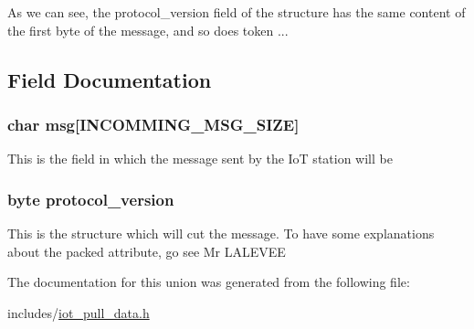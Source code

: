 As we can see, the protocol\-\_\-version field of the structure has the same content of the first byte of the message, and so does token ... 

\subsection{Field Documentation}
\hypertarget{unioniot__pull__data_a019f7d47cfe35a4e91ae5068647c1014}{
\subsubsection[{msg}]{\setlength{\rightskip}{0pt plus 5cm}char msg\mbox{[}{\bf I\-N\-C\-O\-M\-M\-I\-N\-G\-\_\-\-M\-S\-G\-\_\-\-S\-I\-Z\-E}\mbox{]}}}\label{unioniot__pull__data_a019f7d47cfe35a4e91ae5068647c1014}
This is the field in which the message sent by the Io\-T station will be \hypertarget{unioniot__pull__data_a4723ed0bc6ed806bf66757d25e40641a}{
\subsubsection[{protocol\-\_\-version}]{\setlength{\rightskip}{0pt plus 5cm}byte protocol\-\_\-version}}\label{unioniot__pull__data_a4723ed0bc6ed806bf66757d25e40641a}
This is the structure which will cut the message. To have some explanations about the packed attribute, go see Mr L\-A\-L\-E\-V\-E\-E 

The documentation for this union was generated from the following file\-:\begin{DoxyCompactItemize}
\item 
includes/\hyperlink{iot__pull__data_8h}{iot\-\_\-pull\-\_\-data.\-h}\end{DoxyCompactItemize}
